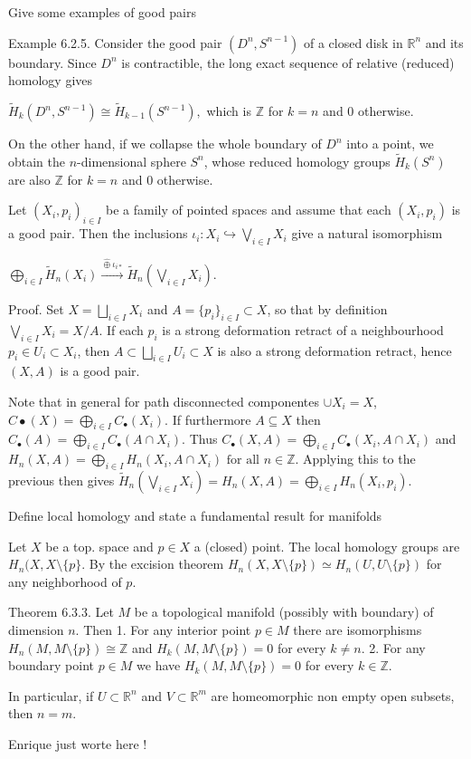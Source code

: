 Give some examples of good pairs

Example 6.2.5. 
Consider the good pair \((D^n, S^{n-1})\) of a closed disk in \(\mathbb{R}^n\) and its boundary. 
Since \(D^n\) is contractible, the long exact sequence of relative (reduced) homology gives 

\(\tilde{H}_k(D^n, S^{n-1}) \cong \tilde{H}_{k-1}(S^{n-1}),\)
which is \(\mathbb{Z}\) for \(k = n\) and 0 otherwise.

On the other hand, if we collapse the whole boundary of \(D^n\) into a point, we obtain the \(n\)-dimensional sphere \(S^n\), 
whose reduced homology groups \(\tilde{H}_k(S^n)\) are also \(\mathbb{Z}\) for \(k = n\) and 0 otherwise.

Let \((X_i, p_i)_{i \in I}\) be a family of pointed spaces and assume that each \((X_i, p_i)\) is a good pair. Then the 
inclusions \(\iota_i: X_i \hookrightarrow \bigvee_{i \in I} X_i\) give a natural isomorphism

\(\bigoplus_{i \in I} \tilde{H}_n(X_i) \xrightarrow{\hat{\oplus} \iota_{i*}} \tilde{H}_n \left( \bigvee_{i \in I} X_i \right).\)

Proof. 
Set \(X = \bigsqcup_{i \in I} X_i\) and \(A = \{p_i\}_{i \in I} \subset X\), so that by definition \(\bigvee_{i \in I} X_i = X/A\).
If each \(p_i\) is a strong deformation retract of a neighbourhood \(p_i \in U_i \subset X_i\), 
then \(A \subset \bigsqcup_{i \in I} U_i \subset X\) is also a strong deformation retract, hence \((X, A)\) is a good pair.

Note that in general for path disconnected componentes \( \cup X_i = X \), \( C\bullet(X) = \bigoplus_{i \in I} C_\bullet(X_i) \). 
If furthermore \( A \subseteq X \) then \( C_\bullet(A) = \bigoplus_{i \in I} C_\bullet(A \cap X_i) \). 
Thus \( C_\bullet(X, A) = \bigoplus_{i \in I} C_\bullet(X_i, A \cap X_i) \) and 
\( H_n(X, A) = \bigoplus_{i \in I} H_n(X_i, A \cap X_i) \text{ for all } n \in \mathbb{Z} \).
Applying this to the previous then gives \( \tilde{H}_n(\bigvee_{i \in I} X_i) = H_n(X, A) = \bigoplus_{i \in I} H_n(X_i, p_i) \).



Define local homology and state a fundamental result for manifolds

Let \( X \) be a top. space and \( p \in X \) a (closed) point. The local homology groups are \( H_n(X, X \setminus \{p\}\).
By the excision theorem \( H_n(X, X\setminus \{p\}) \simeq H_n(U, U \setminus \{p\}) \) for any neighborhood of \( p \).

Theorem 6.3.3. 
Let \(M\) be a topological manifold (possibly with boundary) of dimension \(n\). Then 
1. For any interior point \(p \in M\) there are isomorphisms \(H_n(M, M \setminus \{p\}) \cong \mathbb{Z}\) and \(H_k(M, M \setminus \{p\}) = 0\) for every \(k \neq n\).
2. For any boundary point \(p \in M\) we have \(H_k(M, M \setminus \{p\}) = 0\) for every \(k \in \mathbb{Z}\).

In particular, if \(U \subset \mathbb{R}^n\) and \(V \subset \mathbb{R}^m\) are homeomorphic non empty open subsets, then \(n = m\).

Enrique just worte here !